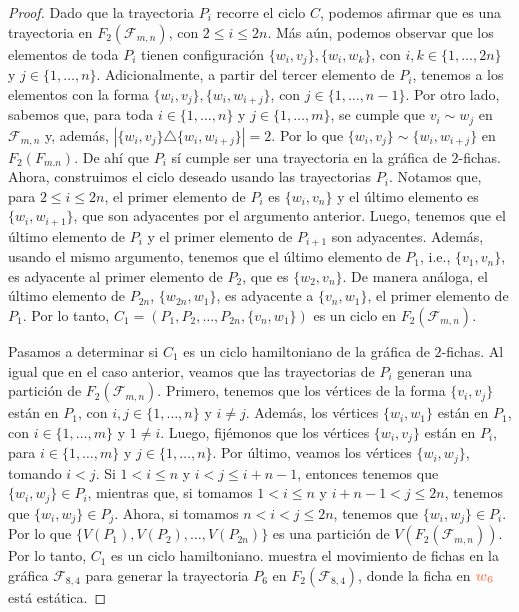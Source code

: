 \begin{proof}
    Dado que la trayectoria $P_i$ recorre el ciclo $C$, podemos afirmar que es
    una trayectoria en $F_2(\mathcal{F}_{m,n})$, con $2\leq i \leq 2n$. M\'as
    a\'un, podemos observar que los elementos de toda $P_i$ tienen
    configuraci\'on $\{w_i,v_j\},\{w_i,w_k\}$, con $i, k\in \{1, \dots, 2n\}$ y
    $j \in \{1, \dots, n\}$. Adicionalmente, a partir del tercer elemento de
    $P_i$, tenemos a los elementos con la forma $\{w_i,v_j\},\{w_i,w_{i+j}\}$,
    con $j \in \{1, \dots, n-1\}$.  Por otro lado, sabemos que, para toda $i \in
    \{1, \dots, n\}$ y $j \in \{1, \dots, m\}$, se cumple que $v_i \sim w_j$ en
    $\mathcal{F}_{m,n}$ y, adem\'as, $|\{w_i,v_j\} \triangle \{w_i,
    w_{i+j}\}|=2$. Por lo que $\{w_i,v_j\} \sim \{w_i, w_{i+j}\}$ en
    $F_2(F_{m.n})$. De ah\'i que $P_i$ s\'i cumple ser una trayectoria en la
    gr\'afica de $2$-fichas. Ahora, construimos el ciclo deseado usando las
    trayectorias $P_i$. Notamos que, para $2 \leq i \leq 2n$, el primer elemento
    de $P_i$ es $\{w_i, v_n\}$ y el \'ultimo elemento es $\{w_i, w_{i+1}\}$, que
    son adyacentes por el argumento anterior. Luego, tenemos que el \'ultimo
    elemento de $P_i$ y el primer elemento de $P_{i+1}$ son adyacentes.
    Adem\'as, usando el mismo argumento, tenemos que el \'ultimo elemento de
    $P_1$, i.e., $\{v_1,v_n\}$, es adyacente al primer elemento de $P_2$, que es
    $\{w_2,v_n\}$. De manera an\'aloga, el \'ultimo elemento de $P_{2n}$,
    $\{w_{2n},w_1\}$, es adyacente a $\{v_n,w_1\}$, el primer elemento de $P_1$.
    Por lo tanto, $C_1 = (P_1,P_2, \dots, P_{2n},\{v_n,w_1\})$ es un ciclo en
    $F_2(\mathcal{F}_{m,n})$. 

    Pasamos a determinar si $C_1$ es un ciclo hamiltoniano de la gr\'afica de
    $2$-fichas. Al igual que en el caso anterior, veamos que las trayectorias de
    $P_i$ generan una partici\'on de $F_2(\mathcal{F}_{m,n})$. Primero, tenemos
    que los v\'ertices de la forma $\{v_i,v_j\}$ est\'an en $P_1$, con $i,j \in
    \{1, \dots, n\}$ y $i \neq j$. Adem\'as, los v\'ertices $\{w_i,w_1\}$
    est\'an en $P_1$, con $i \in \{1, \dots, m\}$ y $1 \neq i$. Luego,
    fij\'emonos que los v\'ertices $\{w_i,v_j\}$ est\'an en $P_i$, para $i\in
    \{1, \dots, m\}$ y $j \in \{1, \dots, n\}$. Por \'ultimo, veamos los
    v\'ertices $\{w_i,w_j\}$, tomando $i < j$. Si $1 < i \leq n$ y $i < j \leq
    i+n-1$, entonces tenemos que $\{w_i,w_j\} \in P_i$, mientras que, si tomamos
    $1 < i \leq n$ y $i+n-1 < j \leq 2n$, tenemos que $\{w_i,w_j\} \in P_j$.
    Ahora, si tomamos $n<i<j \leq 2n$, tenemos que $\{w_i,w_j\} \in P_i$. Por lo
    que $\{V(P_1),V(P_2), \dots, V(P_{2n})\}$ es una partici\'on de
    $V(F_2(\mathcal{F}_{m,n}))$. Por lo tanto, $C_1$ es un ciclo hamiltoniano.
     muestra el movimiento de fichas en la gr\'afica
    $\mathcal{F}_{8,4}$ para generar la trayectoria $P_6$ en
    $F_2(\mathcal{F}_{8,4})$, donde la ficha en ${\color{coral}\boldsymbol
    {w_6}}$ est\'a
    est\'atica.



\end{proof}
